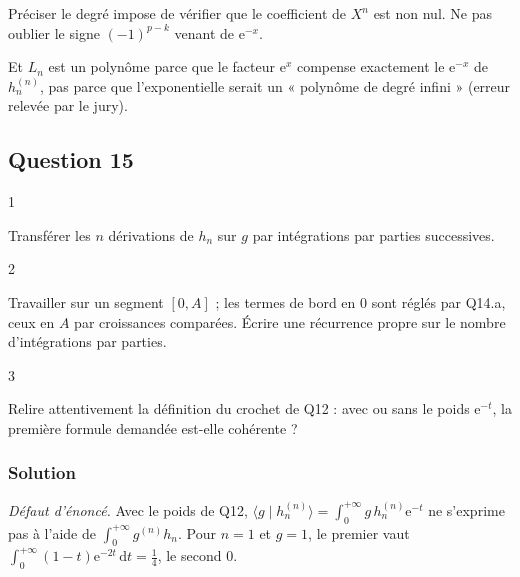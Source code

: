 \documentclass[11pt,a4paper]{article}
\begin{document}
\begin{piege}

Préciser le degré impose de vérifier que le coefficient de \(X^n\) est non nul. Ne pas oublier le signe \((-1)^{p-k}\) venant de \(\mathrm e^{-x}\).

Et \(L_n\) est un polynôme parce que le facteur \(\mathrm e^{x}\) compense exactement le \(\mathrm e^{-x}\) de \(h_n^{(n)}\), pas parce que l'exponentielle serait un « polynôme de degré infini » (erreur relevée par le jury).

\end{piege}

\hypertarget{question-15}{%
\subsection{Question 15}\label{question-15}}

\begin{indication}{1}

Transférer les \(n\) dérivations de \(h_n\) sur \(g\) par intégrations par parties successives.

\end{indication}

\begin{indication}{2}

Travailler sur un segment \([0,A]\) ; les termes de bord en \(0\) sont réglés par Q14.a, ceux en \(A\) par croissances comparées. Écrire une récurrence propre sur le nombre d'intégrations par parties.

\end{indication}

\begin{indication}{3}

Relire attentivement la définition du crochet de Q12 : avec ou sans le poids \(\mathrm e^{-t}\), la première formule demandée est-elle cohérente ?

\end{indication}

\hypertarget{solution-14}{%
\subsubsection{Solution}\label{solution-14}}

\emph{Défaut d'énoncé.} Avec le poids de Q12, \(\langle g\mid h_n^{(n)}\rangle=\int_0^{+\infty}g\,h_n^{(n)}\mathrm e^{-t}\) ne s'exprime pas à l'aide de \(\int_0^{+\infty}g^{(n)}h_n\). Pour \(n=1\) et \(g=1\), le premier vaut \(\int_0^{+\infty}(1-t)\mathrm e^{-2t}\,\mathrm dt=\frac14\), le second \(0\).
\end{document}

